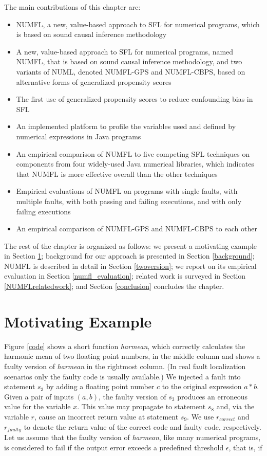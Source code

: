 The main contributions of this chapter are:
\vspace{-0.2cm}
\begin{itemize}
\item NUMFL, a new, value-based approach to SFL for numerical programs, which is based on sound causal inference methodology
	\item A new, value-based approach to SFL for numerical programs, named NUMFL, that is based on sound causal inference methodology, and two variants of NUML, denoted NUMFL-GPS and NUMFL-CBPS, based on alternative forms of generalized propensity scores
	\item The first use of generalized propensity scores to reduce confounding bias in SFL
	\item An implemented platform to profile the variables used and defined by numerical expressions in Java programs
\item An empirical comparison of NUMFL to five competing SFL techniques on components from four widely-used Java numerical libraries, which indicates that NUMFL is more effective overall than the other techniques
    \item Empirical evaluations of NUMFL on programs with single faults, with multiple faults, with both passing and failing executions, and with only failing executions
\item	An empirical comparison of NUMFL-GPS and NUMFL-CBPS to each other
\end{itemize}

The rest of the chapter is organized as follows: we present a motivating example in Section \ref{motivating}; background for our approach is presented in Section \ref{background}; NUMFL is described in detail in Section \ref{twoversion};  we report on its empirical evaluation in Section \ref{numfl_evaluation}; related work is surveyed in Section \ref{NUMFLrelatedwork}; and Section \ref{conclusion} concludes the chapter.

\section{Motivating Example}\label{motivating}

Figure \ref{code} shows a short function {\it harmean}, which correctly calculates the harmonic mean of two floating point numbers, in the middle column and shows a faulty version of {\it harmean} in the rightmost column.  (In real fault localization scenarios only the faulty code is usually available.)  We injected a fault into statement $s_3$ by adding a floating point number $c$ to the original expression $a*b$.  Given a pair of inputs $(a,b)$, the faulty version of $s_3$ produces an erroneous value for the variable $x$.  This value may propagate to statement $s_8$ and, via the variable $r$, cause an incorrect return value at statement $s_9$.  We use $r_{correct}$ and $r_{faulty}$ to denote the return value of the correct code and faulty code, respectively.  Let us assume that the faulty version of {\it harmean}, like many numerical programs, is considered to fail if the output error exceeds a predefined threshold $\epsilon$, that is, if

